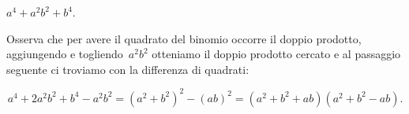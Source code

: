 % 
% 
% 
% 
% 
% 
% 
% 
% 

 \begin{esempio}
 \(a^4+a^{2}b^{2}+b^4\).

Osserva che per avere il quadrato del binomio occorre il doppio
prodotto, aggiungendo e togliendo~\(a^{2}b^{2}\) otteniamo il doppio
prodotto cercato e al passaggio seguente ci troviamo con la differenza
di quadrati:

\[a^4+2a^2b^2+b^4 -a^2b^2=\left(a^2+b^2\right)^2-\left(ab\right)^2%
 =\left(a^2+b^2+ab\right)\left(a^2+b^2-ab\right).\]

 \end{esempio}
% 
% 

